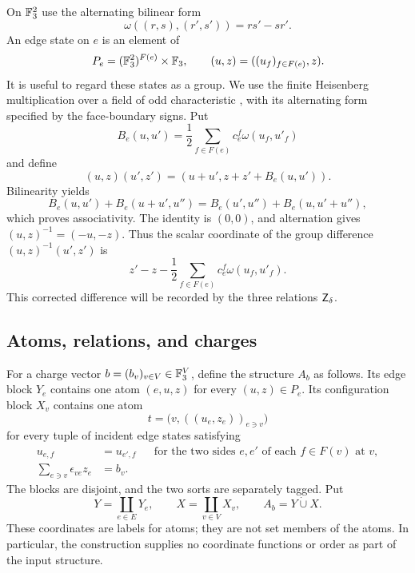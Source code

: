 On $\mathbb F_3^2$ use the alternating bilinear form
\[
 \omega((r,s),(r',s'))=rs'-sr'.
\]
An edge state on $e$ is an element of
\[
 P_e=(\mathbb F_3^2)^{F(e)}\times\mathbb F_3,
 \qquad (u,z)=((u_f)_{f\in F(e)},z).
\]
It is useful to regard these states as a group. We use the finite
Heisenberg multiplication over a field of odd characteristic
\cite[Section~2.1]{gurevichHadani2009}, with its alternating form
specified by the face-boundary signs. Put
\[
 B_e(u,u')=\frac12\sum_{f\in F(e)}c^f_e\omega(u_f,u'_f)
\]
and define
\begin{equation}\label{str:edge-product}
 (u,z)(u',z')=(u+u',z+z'+B_e(u,u')).
\end{equation}
Bilinearity yields
\[
 B_e(u,u')+B_e(u+u',u'')
 =B_e(u',u'')+B_e(u,u'+u''),
\]
which proves associativity.  The identity is $(0,0)$, and alternation gives
$(u,z)^{-1}=(-u,-z)$.  Thus the scalar coordinate of the group difference
$(u,z)^{-1}(u',z')$ is
\begin{equation}\label{str:edge-difference}
 z'-z-\frac12\sum_{f\in F(e)}c^f_e\omega(u_f,u'_f).
\end{equation}
This corrected difference will be recorded by the three relations
$\mathsf Z_\delta$.

\subsection{Atoms, relations, and charges}

For a charge vector $b=(b_v)_{v\in V}\in\mathbb F_3^V$, define the structure $A_b$
as follows.  Its edge block $Y_e$ contains one atom $(e,u,z)$ for every
$(u,z)\in P_e$.  Its configuration block $X_v$ contains one atom
\[
 t=\bigl(v,((u_e,z_e))_{e\ni v}\bigr)
\]
for every tuple of incident edge states satisfying
\begin{equation}\label{str:configuration}
 \begin{aligned}
 u_{e,f}&=u_{e',f}
 &&\text{for the two sides $e,e'$ of each $f\in F(v)$ at $v$},\\
 \sum_{e\ni v}\epsilon_{ve}z_e&=b_v.
 \end{aligned}
\end{equation}
The blocks are disjoint, and the two sorts are separately tagged.  Put
\[
 Y=\coprod_{e\in E}Y_e,\qquad
 X=\coprod_{v\in V}X_v,\qquad A_b=Y\mathbin{\dot\cup}X.
\]
These coordinates are labels for atoms; they are not set members of the
atoms.  In particular, the construction supplies no coordinate functions
or order as part of the input structure.

